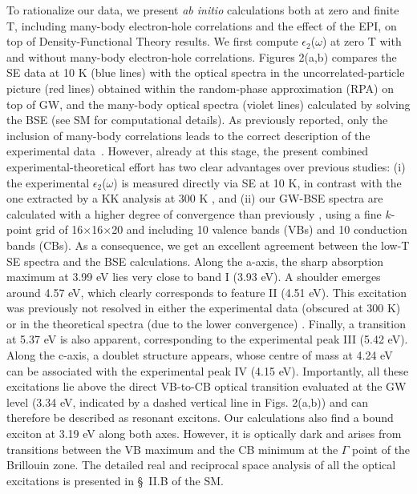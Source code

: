 \documentclass[aps,prl,twocolumn,amsfonts,nobibnotes,superscriptaddress,showpacs]{revtex4-1}
\begin{document}
To rationalize our data, we present \textit{ab initio} calculations both at zero and finite T, including many-body electron-hole correlations and the effect of the EPI, on top of Density-Functional Theory results. We first compute $\epsilon_2$($\omega$) at zero T with and without many-body electron-hole correlations. Figures 2(a,b) compares the SE data at 10 K (blue lines) with the optical spectra in the uncorrelated-particle picture (red lines) obtained within the random-phase approximation (RPA) on top of GW, and the many-body optical spectra (violet lines) calculated by solving the BSE (see SM for computational details). As previously reported, only the inclusion of many-body correlations leads to the correct description of the experimental data~\cite{lawler2008optical, chiodo2010self, kang2010quasiparticle, landmann2012electronic}. However, already at this stage, the present combined experimental-theoretical effort has two clear advantages over previous studies: (i) the experimental $\epsilon_2$($\omega$) is measured directly via SE at 10 K, in contrast with the one extracted by a KK analysis at 300 K \cite{cardona1965optical}, and (ii) our GW-BSE spectra are calculated with a higher degree of convergence than previously \cite{lawler2008optical, chiodo2010self, kang2010quasiparticle, landmann2012electronic}, using a fine $k$-point grid of 16$\times$16$\times$20 and including 10 valence bands (VBs) and 10 conduction bands (CBs). As a consequence, we get an excellent agreement between the low-T SE spectra and the BSE calculations. Along the a-axis, the sharp absorption maximum at 3.99 eV lies very close to band I (3.93 eV). A shoulder emerges around 4.57 eV, which clearly corresponds to feature II (4.51 eV). This excitation was previously not resolved in either the experimental data (obscured at 300 K) \cite{cardona1965optical, tiwald2000measurement} or in the theoretical spectra (due to the lower convergence) \cite{lawler2008optical, chiodo2010self, kang2010quasiparticle, landmann2012electronic}. Finally, a transition at 5.37 eV is also apparent, corresponding to the experimental peak III (5.42 eV). Along the c-axis, a doublet structure appears, whose centre of mass at 4.24 eV can be associated with the experimental peak IV (4.15 eV). Importantly, all these excitations lie above the direct VB-to-CB optical transition evaluated at the GW level (3.34 eV, indicated by a dashed vertical line in Figs. 2(a,b)) and can therefore be described as resonant excitons. Our calculations also find a bound exciton at 3.19 eV along both axes. However, it is optically dark and arises from transitions between the VB maximum and the CB minimum at the $\Gamma$ point of the Brillouin zone. The detailed real and reciprocal space analysis of all the optical excitations is presented in \S~II.B of the SM. 
\end{document}
